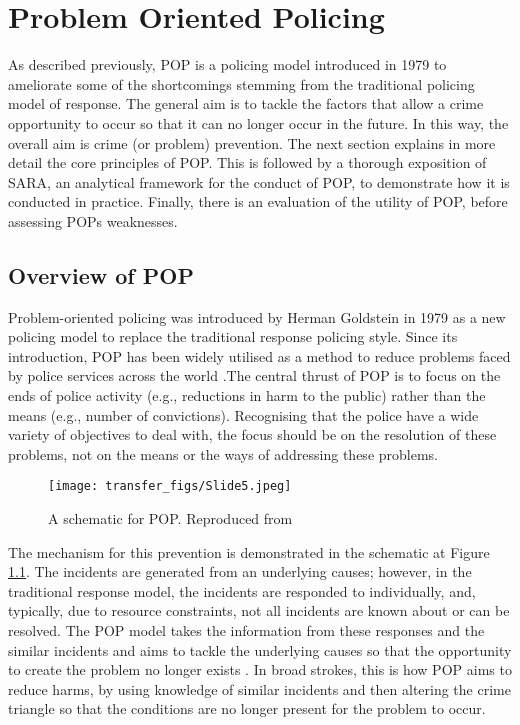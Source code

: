 

\chapter{Problem Oriented Policing}

As described previously, POP is a policing model introduced in 1979 to ameliorate some of the shortcomings stemming from the traditional policing model of response. The general aim is to tackle the factors that allow a crime opportunity to occur so that it can no longer occur in the future. In this way, the overall aim is crime (or problem) prevention. The next section explains in more detail the core principles of POP. This is followed by a thorough exposition of SARA, an analytical framework for the conduct of POP, to demonstrate how it is conducted in practice. Finally, there is an evaluation of the utility of POP, before assessing POPs weaknesses.

\section{Overview of POP}

Problem-oriented policing was introduced by Herman Goldstein in 1979 \parencite{gold79} as a new policing model to replace the traditional response policing style. Since its introduction, POP has been widely utilised as a method to reduce problems faced by police services across the world \parencite{fairnessandeffectivenessinpolicing_2004, stockholmlec}.The central thrust of POP is to focus on the ends of police activity (e.g., reductions in harm to the public) rather than the means (e.g., number of convictions). Recognising that the police have a wide variety of objectives to deal with, the focus should be on the resolution of these problems, not on the means or the ways of addressing these problems.

\begin{figure}
  \texttt{[image: transfer\_figs/Slide5.jpeg]}
  \caption[A schematic of POP.]{A schematic for POP. Reproduced from \textcite{eck1987problem}}
  \label{fig:POP}
\end{figure}

The mechanism for this prevention is demonstrated in the schematic at Figure \ref{fig:POP}. The incidents are generated from an underlying causes; however, in the traditional response model, the incidents are responded to individually, and, typically, due to resource constraints, not all incidents are known about or can be resolved. The POP model takes the information from these responses and the similar incidents and aims to tackle the underlying causes so that the opportunity to create the problem no longer exists  \parencite{eck1987problem}. In broad strokes, this is how POP aims to reduce harms, by using knowledge of similar incidents and then altering the crime triangle so that the conditions are no longer present for the problem to occur.

